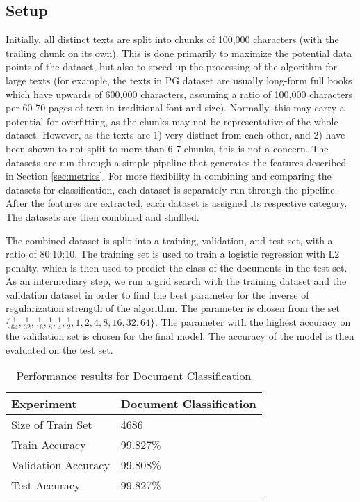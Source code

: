 \subsection*{Setup}
Initially, all distinct texts are split into chunks of 100,000 characters (with the trailing chunk on its own). This is done primarily to maximize the potential data points of the dataset, but also to speed up the processing of the algorithm for large texts (for example, the texts in PG dataset are usually long-form full books which have upwards of 600,000 characters, assuming a ratio of 100,000 characters per 60-70 pages of text in traditional font and size). Normally, this may carry a potential for overfitting, as the chunks may not be representative of the whole dataset. However, as the texts are 1) very distinct from each other, and 2) have been shown to not split to more than 6-7 chunks, this is not a concern. 
The datasets are run through a simple pipeline that generates the features described in Section \ref{sec:metrics}. For more flexibility in combining and comparing the datasets for classification, each dataset is separately run through the pipeline. After the features are extracted, each dataset is assigned its respective category. The datasets are then combined and shuffled.

The combined dataset is split into a training, validation, and test set, with a ratio of 80:10:10. The training set is used to train a logistic regression with L2 penalty, which is then used to predict the class of the documents in the test set. As an intermediary step, we run a grid search with the training dataset and the validation dataset in order to find the best parameter for the inverse of regularization strength of the algorithm. The parameter is chosen from the set $\{\frac{1}{64}, \frac{1}{32}, \frac{1}{16}, \frac{1}{8}, \frac{1}{4}, \frac{1}{2}, 1, 2, 4, 8 , 16, 32 , 64\}$. The parameter with the highest accuracy on the validation set is chosen for the final model. The accuracy of the model is then evaluated on the test set.

\begin{table}[htbp]
    \centering
    \caption{Performance results for Document Classification}
    \label{tab:document_classification}
    \begin{tabular}{ll}
    \toprule
    Experiment & Document Classification \\
    \midrule
    Size of Train Set & 4686 \\
    Train Accuracy & 99.827\% \\
    Validation Accuracy & 99.808\% \\
    Test Accuracy & 99.827\% \\
    \bottomrule
    \end{tabular}
    \end{table}

